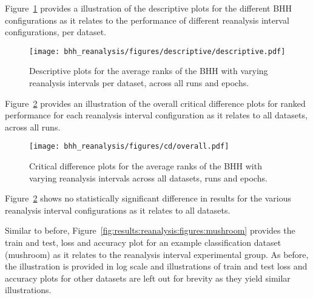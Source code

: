 Figure~\ref{fig:results:reanalysis:descriptive:descriptive} provides a illustration of the descriptive plots for the different \acs{BHH} configurations as it relates to the performance of different reanalysis interval configurations, per dataset.

\begin{figure}[H]
	\centering
	\texttt{[image: bhh\_reanalysis/figures/descriptive/descriptive.pdf]}
	\caption{Descriptive plots for the average ranks of the \acs{BHH} with varying reanalysis intervals per dataset, across all runs and epochs.}
	\label{fig:results:reanalysis:descriptive:descriptive}
\end{figure}

Figure~\ref{fig:results:reanalysis:descriptive:cd} provides an illustration of the overall critical difference plots for ranked performance for each reanalysis interval configuration as it relates to all datasets, across all runs.

\begin{figure}[H]
	\centering
	\texttt{[image: bhh\_reanalysis/figures/cd/overall.pdf]}
	\caption{Critical difference plots for the average ranks of the \acs{BHH} with varying reanalysis intervals across all datasets, runs and epochs.}
	\label{fig:results:reanalysis:descriptive:cd}
\end{figure}

Figure~\ref{fig:results:reanalysis:descriptive:cd} shows no statistically significant difference in results for the various reanalysis interval configurations as it relates to all datasets.

Similar to before, Figure~\ref{fig:results:reanalysis:figures:mushroom} provides the train and test, loss and accuracy plot for an example classification dataset (mushroom) as it relates to the reanalysis interval experimental group. As before, the illustration is provided in log scale and illustrations of train and test loss and accuracy plots for other datasets are left out for brevity as they yield similar illustrations.

